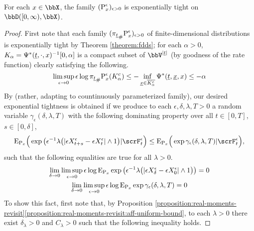 \begin{proposition}
  \label{proposition:exponential-tightness}
  For each $\stateVar \in \stateSpace$, the family $(\Prb^\epsilon_\stateVar)_{\epsilon>0}$ is exponentially tight on $\pathSpace{[0,\infty)}{\stateSpace}$.
\end{proposition}
\begin{proof}
  \label{proof:proposition:exponential-tightness}
  First note that each family $(\push{\Prb^\epsilon_\stateVar}{\pi_{\underline t}})_{\epsilon>0}$ of finite-dimensional distributions is exponentially tight by Theorem \ref{theorem:fdds}; for each $\alpha > 0$, $K_\alpha = \aff^*(\underline t, \cdot, \stateVar)^{-1}[0,\alpha]$ is a compact subset of $\vecSpace^{|\underline t|}$ (by goodness of the rate function) clearly satisfying the following.
  \begin{equation*}
    \limsup_{\epsilon\rightarrow0} \epsilon\log\push{\Prb^\epsilon_\stateVar}{\pi_{\underline t}} (K_\alpha^c) \leq -\inf_{\underline\stateVar\in \overline{K_\alpha^c}} \aff^*(\underline t, \underline\stateVar, \stateVar) \leq -\alpha
  \end{equation*}
  By \cite[Theorem 4.1]{feng2006} (rather, adapting to countinuously parameterized family), our desired exponential tightness is obtained if we produce to each $\epsilon, \delta, \lambda, T > 0$ a random variable $\gamma_\epsilon(\delta,\lambda,T)$ with the following dominating property over all $t \in [0,T]$, $s \in [0,\delta]$,
  \begin{gather}
    \label{eq:gamma-dominating}
    \Exp_{\Prb_\stateVar}\Big(
      \exp\big( \epsilon^{-1} \lambda \big( |\Xe_{t+s}-\Xe_t| \wedge 1 \big) 
      | \scrF^\epsilon_t \Big) 
    \leq \Exp_{\Prb_\stateVar}\Big( 
      \exp\gamma_\epsilon(\delta, \lambda, T) 
      | \scrF^\epsilon_t \Big),
  \end{gather}
  such that the following equalities are true for all $\lambda > 0$.
  \begin{gather}
    \label{eq:no-gamma-bound}
    \lim_{\delta\rightarrow0} \limsup_{\epsilon\rightarrow0} 
      \epsilon\log\Exp_{\Prb_\stateVar}\exp\big( 
        \epsilon^{-1}\lambda \big(|\Xe_\delta - \Xe_0| \wedge 1\big) 
      \big) = 0 \\
    \label{eq:gamma-bound}
    \lim_{\delta\rightarrow0} \limsup_{\epsilon\rightarrow0} \epsilon\log\Exp_{\Prb_\stateVar}\exp\gamma_\epsilon(\delta,\lambda, T) = 0 
  \end{gather}
  To show this fact, first note that, by Proposition \ref{proposition:real-moments-revisit}\ref{proposition:real-moments-revisit:aff-uniform-bound}, to each $\lambda > 0$ there exist $\delta_\lambda > 0$ and $C_\lambda > 0$ such that the following inequality holds.

\end{proof}
